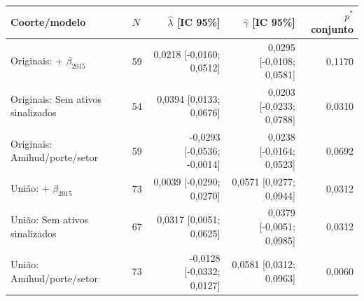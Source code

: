 \begin{tabular}{llrrr}
\toprule
Coorte/modelo & $N$ & $\widehat\lambda$ [IC 95\%] & $\widehat\gamma$ [IC 95\%] & $p^*$ conjunto\\
\midrule
Originais: + $\beta_{2015}$ & 59 & 0,0218 [-0,0160; 0,0512] & 0,0295 [-0,0108; 0,0581] & 0,1170\\
Originais: Sem ativos sinalizados & 54 & 0,0394 [0,0133; 0,0676] & 0,0203 [-0,0233; 0,0788] & 0,0310\\
Originais: Amihud/porte/setor & 59 & -0,0293 [-0,0536; -0,0014] & 0,0238 [-0,0164; 0,0523] & 0,0692\\
União: + $\beta_{2015}$ & 73 & 0,0039 [-0,0290; 0,0270] & 0,0571 [0,0277; 0,0944] & 0,0312\\
União: Sem ativos sinalizados & 67 & 0,0317 [0,0051; 0,0625] & 0,0379 [-0,0051; 0,0985] & 0,0312\\
União: Amihud/porte/setor & 73 & -0,0128 [-0,0332; 0,0127] & 0,0581 [0,0312; 0,0963] & 0,0060\\
\bottomrule
\end{tabular}
